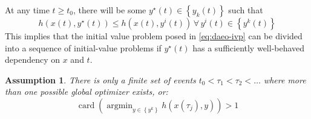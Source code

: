 \documentclass[twoside,leqno, twocolumn]{article}
\DeclareMathOperator*{\argmin}{\arg\min}
\DeclareMathOperator{\card}{\mathrm{card}}
\newtheorem{assumption}{Assumption}[section]
\begin{document}
At any time $t \geq t_0$, there will be some $y^\star(t)\in\left\{y_k(t)\right\}$ such that
\begin{equation}
	h(x(t), y^\star(t))\leq h(x(t),y^i(t))\, \forall\,y^i(t)\in\left\{y^k(t)\right\} 
\end{equation}
This implies that the initial value problem posed in \eqref{eq:daeo-ivp} can be divided into a sequence of initial-value problems if $y^\star(t)$ has a sufficiently well-behaved dependency on $x$ and $t$\cite{deussenNumericalSimulationDifferentialalgebraic2023}.

\begin{assumption}
	\label{assume:events-exist}
	There is only a finite set of events $t_0 < \tau_1 < \tau_2 < \ldots$ where more than one possible global optimizer exists, or:
	\begin{equation*}
		\card\left(\argmin_{y\in\left\{y^k\right\}}h(x(\tau_j), y)\right) > 1
	\end{equation*}
\end{assumption}
\end{document}
